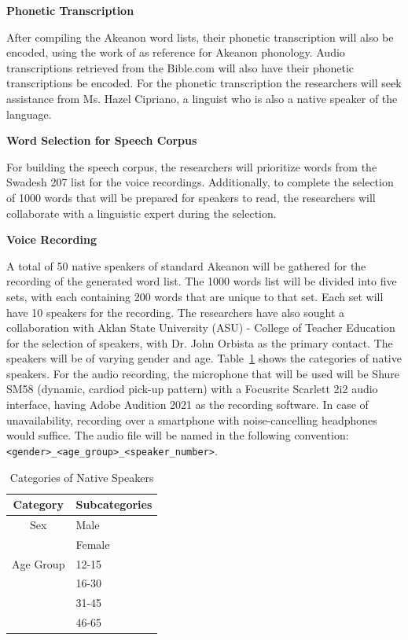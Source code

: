 \textbf{Phonetic Transcription}

After compiling the Akeanon word lists, their phonetic transcription will also be encoded, using the work of  as reference for Akeanon phonology. Audio transcriptions retrieved from the Bible.com will also have their phonetic transcriptions be encoded. For the phonetic transcription the researchers will seek assistance from Ms. Hazel Cipriano, a linguist who is also a native speaker of the language.

\textbf{Word Selection for Speech Corpus}

For building the speech corpus, the researchers will prioritize words from the Swadesh 207 list for the voice recordings. Additionally, to complete the selection of 1000 words that will be prepared for speakers to read, the researchers will collaborate with a linguistic expert during the selection.

\textbf{Voice Recording}

A total of 50 native speakers of standard Akeanon will be gathered for the recording of the generated word list. The 1000 words list will be divided into five sets, with each containing 200 words that are unique to that set. Each set will have 10 speakers for the recording. The researchers have also sought a collaboration with Aklan State University (ASU) - College of Teacher Education for the selection of speakers, with Dr. John Orbista as the primary contact. The speakers will be of varying gender and age. Table~\ref{tab:native_speakers} shows the categories of native speakers. For the audio recording, the microphone that will be used will be Shure SM58 (dynamic, cardiod pick-up pattern) with a Focusrite Scarlett 2i2 audio interface, having Adobe Audition 2021 as the recording software. In case of unavailability, recording over a smartphone with noise-cancelling headphones would suffice. The audio file will be named in the following convention: \texttt{\textless gender\textgreater\_\textless age\_group\textgreater\_\textless speaker\_number\textgreater}.

\begin{table}[ht]
   \centering
   \caption{Categories of Native Speakers} \vspace{0.25em}
   \label{tab:native_speakers}
   \renewcommand{\arraystretch}{1.5} %
   \setlength{\tabcolsep}{10pt} %

\begin{tabular}{|c|p{2in}|} \hline
   \centering Category & Subcategories \\ \hline
   Sex & Male \\ 
   & Female \\ 
   Age Group & 12-15 \\ 
   & 16-30 \\ 
   & 31-45 \\ 
   & 46-65 \\ \hline
\end{tabular}
\end{table}

